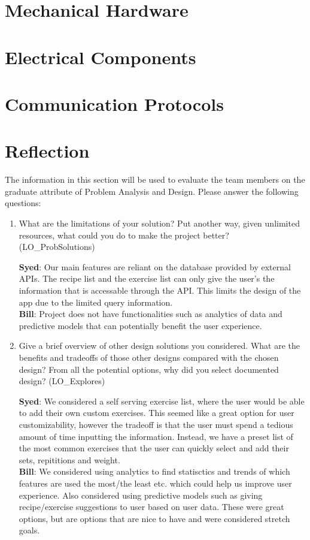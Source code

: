 \documentclass[12pt, titlepage]{article}
\begin{document}
\section{Mechanical Hardware}

\section{Electrical Components}

\section{Communication Protocols}

\section{Reflection}

The information in this section will be used to evaluate the team members on the
graduate attribute of Problem Analysis and Design.  Please answer the following questions:

\begin{enumerate}
  \item What are the limitations of your solution?  Put another way, given
  unlimited resources, what could you do to make the project better? (LO\_ProbSolutions)
	
\textbf{Syed}: Our main features are reliant on the database provided by external APIs. The recipe list and the exercise list can only give the user's the information that is accessable through the API. This limits the design of the app due to the limited query information. \\
\textbf{Bill}: Project does not have functionalities such as analytics of data and predictive models that can potentially benefit the user experience. \\
  \item Give a brief overview of other design solutions you considered.  What
  are the benefits and tradeoffs of those other designs compared with the chosen
  design?  From all the potential options, why did you select documented design?
  (LO\_Explores)

\textbf{Syed}: We considered a self serving exercise list, where the user would be able to add their own custom exercises. This seemed like a great option for user customizability, however the tradeoff is that the user must spend a tedious amount of time inputting the information. Instead, we have a preset list of the most common exercises that the user can quickly select and add their sets, repititions and weight. \\
\textbf{Bill}: We considered using analytics to find statisctics and trends of which features are used the most/the least etc. which could help us improve user experience. Also considered using predictive models such as giving recipe/exercise suggestions to user based on user data. These were great options, but are options that are nice to have and were considered stretch goals. \\
\end{enumerate}
\end{document}

